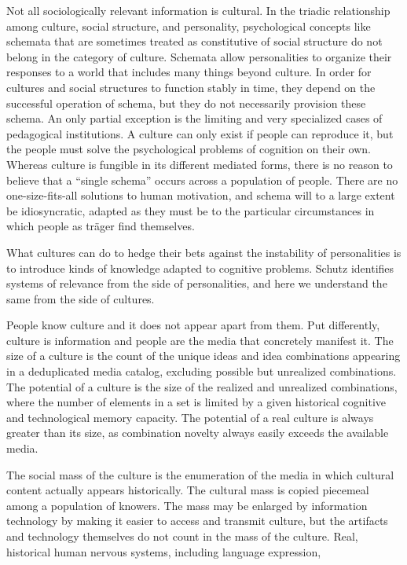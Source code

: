 \documentclass[]{book}
\theoremstyle{definition}
\theoremstyle{definition}
\theoremstyle{definition}
\theoremstyle{remark}
\begin{document}
Not all sociologically relevant information is cultural. In the triadic
relationship among culture, social structure, and personality,
psychological concepts like schemata that are sometimes treated as
constitutive of social structure do not belong in the category of
culture. Schemata allow personalities to organize their responses to a
world that includes many things beyond culture. In order for cultures
and social structures to function stably in time, they depend on the
successful operation of schema, but they do not necessarily provision
these schema. An only partial exception is the limiting and very
specialized cases of pedagogical institutions. A culture can only exist
if people can reproduce it, but the people must solve the psychological
problems of cognition on their own. Whereas culture is fungible in its
different mediated forms, there is no reason to believe that a ``single
schema'' occurs across a population of people. There are no
one-size-fits-all solutions to human motivation, and schema will to a
large extent be idiosyncratic, adapted as they must be to the particular
circumstances in which people as träger find themselves.

What cultures can do to hedge their bets against the instability of
personalities is to introduce kinds of knowledge adapted to cognitive
problems. Schutz identifies systems of relevance from the side of
personalities, and here we understand the same from the side of
cultures.

People know culture and it does not appear apart from them. Put
differently, culture is information and people are the media that
concretely manifest it. The size of a culture is the count of the unique
ideas and idea combinations appearing in a deduplicated media catalog,
excluding possible but unrealized combinations. The potential of a
culture is the size of the realized and unrealized combinations, where
the number of elements in a set is limited by a given historical
cognitive and technological memory capacity. The potential of a real
culture is always greater than its size, as combination novelty always
easily exceeds the available media.

The social mass of the culture is the enumeration of the media in which
cultural content actually appears historically. The cultural mass is
copied piecemeal among a population of knowers. The mass may be enlarged
by information technology by making it easier to access and transmit
culture, but the artifacts and technology themselves do not count in the
mass of the culture. Real, historical human nervous systems, including
language expression,
\end{document}
